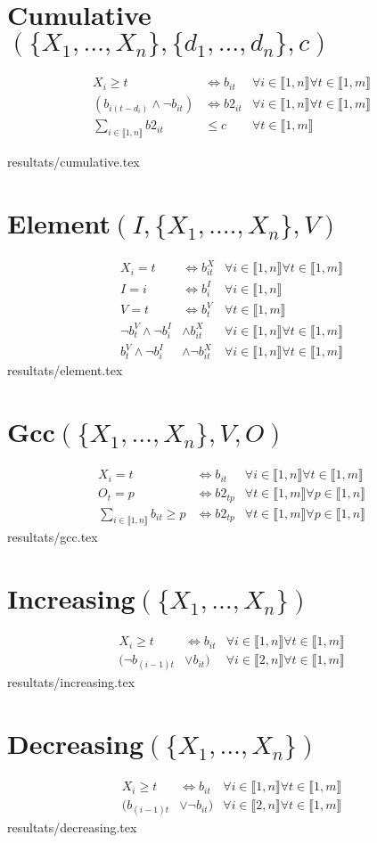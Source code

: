 \documentclass{article}
\newcommand{\cumul}{Cumulative$(\{X_1,\ldots,X_n\},\{d_1,\ldots,d_n\},c)~$}
\newcommand{\increasing}{Increasing$(\{X_1,\ldots,X_n\})~$}
\newcommand{\decreasing}{Decreasing$(\{X_1,\ldots,X_n\})~$}
\newcommand{\gcc}{Gcc$(\{X_1,\ldots,X_n\},V,O)~$}
\newcommand{\element}{Element$(I,\{X_1,.\ldots,X_n\},V)~$}
\newcommand{\I}{i\in\llbracket1,n\rrbracket}
\newcommand{\T}{t\in\llbracket1,m\rrbracket}
\newcommand{\PP}{p\in\llbracket1,n\rrbracket}
\newcommand{\fai}{\forall\I}
\newcommand{\fat}{\forall\T}
\newcommand{\fap}{\forall\PP}
\newcommand{\fit}{\fai\fat}
\begin{document}
\section{\cumul}
\begin{align*}
    X_i \geq t & \iff b_{it}&\fit\\
    (b_{i(t-d_i)} \wedge \neg b_{it}) & \iff b2_{it}&\fit\\
    \sum_{\I} b2_{it} & \leq c & \fat
\end{align*}
\begin{tiny}
{resultats/cumulative.tex}
\end{tiny}
\section{\element}
\begin{align*}
    X_i=t &\iff b_{it}^X&\fit\\
    I=i &\iff b_i^I&\fai\\
    V=t &\iff b_t^V&\fat\\
    \neg b_t^V\wedge \neg b_i^I & \wedge b_{it}^X &\fit\\
    b_t^V\wedge \neg b_i^I & \wedge \neg b_{it}^X &\fit
\end{align*}
{resultats/element.tex}
\section{\gcc}
\begin{align*}
    X_i=t &\iff b_{it}&\fit\\
    O_t=p &\iff b2_{tp}&\fat\fap\\
    \sum_{\I}b_{it} \geq p&\iff b2_{tp}&\fat\fap
\end{align*}
{resultats/gcc.tex}
\section{\increasing}
\begin{align*}
    X_i \geq t & \iff b_{it}&\fit\\
    (\neg b_{(i-1)t} & \vee b_{it})&\forall i\in\llbracket2,n\rrbracket\fat 
\end{align*}
{resultats/increasing.tex}
\section{\decreasing}
\begin{align*}
    X_i \geq t & \iff b_{it}&\fit\\
    (b_{(i-1)t} & \vee \neg b_{it})&\forall i\in\llbracket2,n\rrbracket\fat 
\end{align*}
{resultats/decreasing.tex}
\end{document}
